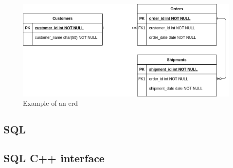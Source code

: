 %
\begin{figure}[htb!]
\centering
    \includegraphics[width=0.8\columnwidth]{./img/erd-example.png}
  \caption{Example of an \gls{erd}}%
\label{fig:erd-example}
\end{figure}
%




\subsection{SQL}
\label{sec:sql}

\subsection{SQL C++ interface}
\label{sec:sql-c++-interface}





